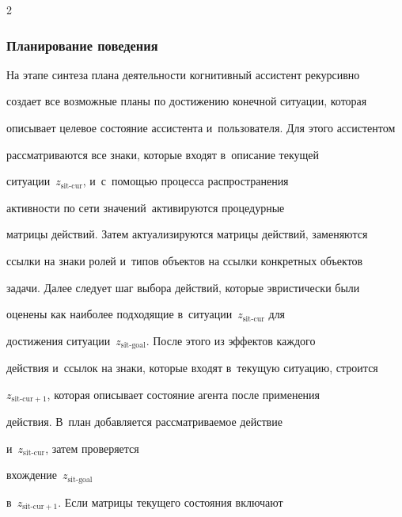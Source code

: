 \begin{multicols}{2}
  




  


  \subsubsection{Планирование поведения} %


  


  На этапе синтеза плана деятельности когнитивный ассистент рекурсивно 


создает все возможные планы по достижению конечной ситуации, которая 


описывает целевое состояние ассистента и~пользователя. Для этого ассистентом 


рассматриваются все знаки, которые входят в~описание текущей\linebreak 


ситуации~$z_{\mathrm{sit}\mbox{-}\mathrm{cur}}$, и~с~по\-мощью процесса распространения 


активности по сети значений~\cite{3-sm, 5-sm}\linebreak активируются процедурные 


матрицы действий. Затем актуализируются матрицы действий, заменяются 


ссылки на знаки ролей и~типов объектов на ссылки конкретных объектов 


задачи. Далее следует шаг выбора действий, которые эвристически были 


оценены как наиболее подходящие в~ситуации~$z_{\mathrm{sit}\mbox{-}\mathrm{cur}}$ для 


достижения ситуации~$z_{\mathrm{sit}\mbox{-}\mathrm{goal}}$. После этого из эффектов каждого 


действия и~ссылок на знаки, которые входят в~текущую ситуацию, строится 


$z_{\mathrm{sit}\mbox{-}\mathrm{cur}+1}$, которая описывает состояние агента после применения 


действия. В~план добавляется рассматриваемое действие  


и~$z_{\mathrm{sit}\mbox{-}\mathrm{cur}}$, затем проверяется


 вхождение~$z_{\mathrm{sit}\mbox{-}\mathrm{goal}}$ 


в~$z_{\mathrm{sit}\mbox{-}\mathrm{cur}+1}$. Если матрицы текущего состояния включают 



\end{multicols}
